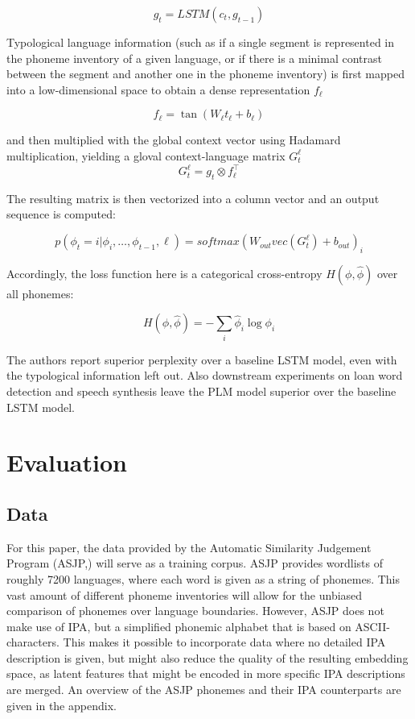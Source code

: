 \documentclass[11pt]{article}
\begin{document}
\begin{equation}
g_t = LSTM(c_t,g_{t-1}) 
\label{eq:plm_2}
\end{equation}

Typological language information (such as if a single segment is represented in the phoneme inventory of a given language, or if there is a minimal contrast between the segment and another one in the phoneme inventory) is first mapped into a low-dimensional space to obtain a dense representation $f_\ell$

\begin{equation}
f_\ell = \tan(W_\ell t_\ell + b_\ell) 
\label{eq:plm_3}
\end{equation}


and then multiplied with the global context vector using Hadamard multiplication, yielding a gloval context-language matrix $G_t^\ell$
\begin{equation}
G_t^\ell = g_t \otimes f_\ell^\top 
\label{eq:plm_4}
\end{equation}


The resulting matrix is then vectorized into a column vector and an output sequence is computed:

\begin{equation}
p(\phi_t = i | \phi_i,\ldots,\phi_{t-1},\ell) = softmax(W_{out}vec(G_t^\ell)+b_{out})_i 
\label{eq:plm_5}
\end{equation}

Accordingly, the loss function here is a categorical cross-entropy $H(\phi,\hat{\phi})$ over all phonemes:

\begin{equation}
H(\phi,\hat{\phi}) = - \sum_i \hat{\phi}_i \log \phi_i
\label{eq:plm_6}
\end{equation}

The authors report superior perplexity over a baseline LSTM model, even with the typological information left out. Also downstream experiments on loan word detection and  speech synthesis leave the PLM model superior over the baseline LSTM model.

\section{Evaluation}
\subsection{Data}
For this paper, the data provided by the Automatic Similarity Judgement Program (ASJP,) will serve as a training corpus. ASJP provides wordlists of roughly 7200 languages, where each word is given as a string of phonemes. This vast amount of different phoneme inventories will allow for the unbiased comparison of phonemes over language boundaries. However, ASJP does not make use of IPA, but a simplified phonemic alphabet that is based on ASCII-characters. This makes it possible to incorporate data where no detailed IPA description is given, but might also reduce the quality of the resulting embedding space, as latent features that might be encoded in more specific IPA descriptions are merged. An overview of the ASJP phonemes and their IPA counterparts are given in the appendix.
\end{document}
